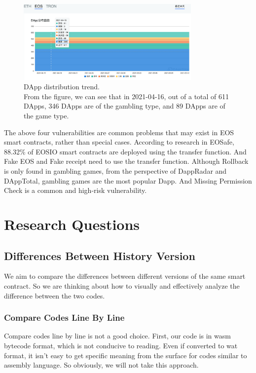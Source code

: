 \documentclass[a4paper, 10pt, conference, twocolumn]{ieeeconf}       %
\begin{document}
\begin{figure}[t]
    \centering
    \includegraphics[width=0.8\textwidth]{figures/dapptotal.png}
    \caption{DApp distribution trend. \\ From the figure, we can see that in 2021-04-16, out of a total of 611 DApps, 346 DApps are of the gambling type, and 89 DApps are of the game type.}
\end{figure}

The above four vulnerabilities are common problems that may exist in EOS smart contracts,
rather than special cases.
According to research in EOSafe, 88.32\% of EOSIO smart contracts are deployed using the transfer function.
And Fake EOS and Fake receipt need to use the transfer function.
Although Rollback is only found in gambling games,
from the perspective of DappRadar\cite{DappRadar} and DAppTotal\cite{DAppTotal},
gambling games are the most popular Dapp.
And Missing Permission Check is a common and high-risk vulnerability.

\section{Research Questions}


\subsection{Differences Between History Version}

We aim to compare the differences between different versions of the same smart contract.
So we are thinking about how to visually and effectively analyze the difference between the two codes.

\subsubsection{Compare Codes Line By Line}
Compare codes line by line is not a good choice. First,
our code is in wasm bytecode format, which is not conducive to reading.
Even if converted to wat format,
it isn't easy to get specific meaning from the surface for codes similar to assembly language.
So obviously, we will not take this approach.
\end{document}
